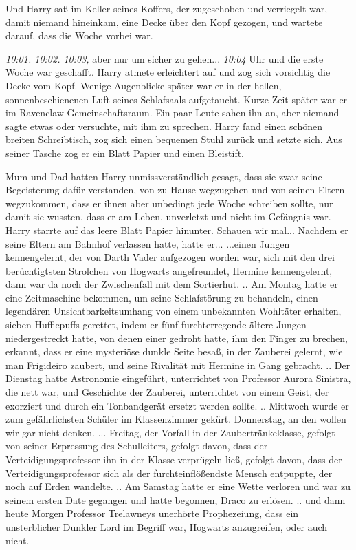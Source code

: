 Und Harry saß im Keller seines Koffers, der zugeschoben und verriegelt war,
damit niemand hineinkam, eine Decke über den Kopf gezogen, und wartete darauf,
dass die Woche vorbei war.

\emph{10:01. 10:02. 10:03,} aber nur um sicher zu gehen... \emph{10:04 }Uhr und
die erste Woche war geschafft. Harry atmete erleichtert auf und zog sich
vorsichtig die Decke vom Kopf. Wenige Augenblicke später war er in der hellen,
sonnenbeschienenen Luft seines Schlafsaals aufgetaucht. Kurze Zeit später war er
im Ravenclaw-Gemeinschaftsraum. Ein paar Leute sahen ihn an, aber niemand sagte
etwas oder versuchte, mit ihm zu sprechen. Harry fand einen schönen breiten
Schreibtisch, zog sich einen bequemen Stuhl zurück und setzte sich. Aus seiner
Tasche zog er ein Blatt Papier und einen Bleistift.

Mum und Dad hatten Harry unmissverständlich gesagt, dass sie zwar seine
Begeisterung dafür verstanden, von zu Hause wegzugehen und von seinen Eltern
wegzukommen, dass er ihnen aber unbedingt jede Woche schreiben sollte, nur damit
sie wussten, dass er am Leben, unverletzt und nicht im Gefängnis war. Harry
starrte auf das leere Blatt Papier hinunter. Schauen wir mal... Nachdem er seine
Eltern am Bahnhof verlassen hatte, hatte er... ...einen Jungen kennengelernt,
der von Darth Vader aufgezogen worden war, sich mit den drei berüchtigtsten
Strolchen von Hogwarts angefreundet, Hermine kennengelernt, dann war da noch der
Zwischenfall mit dem Sortierhut. .. Am Montag hatte er eine Zeitmaschine
bekommen, um seine Schlafstörung zu behandeln, einen legendären
Unsichtbarkeitsumhang von einem unbekannten Wohltäter erhalten, sieben
Hufflepuffs gerettet, indem er fünf furchterregende ältere Jungen
niedergestreckt hatte, von denen einer gedroht hatte, ihm den Finger zu brechen,
erkannt, dass er eine mysteriöse dunkle Seite besaß, in der Zauberei gelernt,
wie man Frigideiro zaubert, und seine Rivalität mit Hermine in Gang gebracht. ..
Der Dienstag hatte Astronomie eingeführt, unterrichtet von Professor Aurora
Sinistra, die nett war, und Geschichte der Zauberei, unterrichtet von einem
Geist, der exorziert und durch ein Tonbandgerät ersetzt werden sollte. ..
Mittwoch wurde er zum gefährlichsten Schüler im Klassenzimmer gekürt.
Donnerstag, an den wollen wir gar nicht denken. ... Freitag, der Vorfall in der
Zaubertränkeklasse, gefolgt von seiner Erpressung des Schulleiters, gefolgt
davon, dass der Verteidigungsprofessor ihn in der Klasse verprügeln ließ,
gefolgt davon, dass der Verteidigungsprofessor sich als der furchteinflößendste
Mensch entpuppte, der noch auf Erden wandelte. .. Am Samstag hatte er eine Wette
verloren und war zu seinem ersten Date gegangen und hatte begonnen, Draco zu
erlösen. .. und dann heute Morgen Professor Trelawneys unerhörte Prophezeiung,
dass ein unsterblicher Dunkler Lord im Begriff war, Hogwarts anzugreifen, oder
auch nicht.


